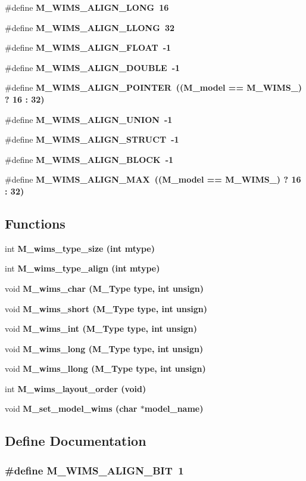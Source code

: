 \begin{CompactItemize}
\#define \bf{M\_\-WIMS\_\-ALIGN\_\-LONG}~16
\item 
\#define \bf{M\_\-WIMS\_\-ALIGN\_\-LLONG}~32
\item 
\#define \bf{M\_\-WIMS\_\-ALIGN\_\-FLOAT}~-1
\item 
\#define \bf{M\_\-WIMS\_\-ALIGN\_\-DOUBLE}~-1
\item 
\#define \bf{M\_\-WIMS\_\-ALIGN\_\-POINTER}~((\bf{M\_\-model} == M\_\-WIMS\_) ? 16 : 32)
\item 
\#define \bf{M\_\-WIMS\_\-ALIGN\_\-UNION}~-1
\item 
\#define \bf{M\_\-WIMS\_\-ALIGN\_\-STRUCT}~-1
\item 
\#define \bf{M\_\-WIMS\_\-ALIGN\_\-BLOCK}~-1
\item 
\#define \bf{M\_\-WIMS\_\-ALIGN\_\-MAX}~((\bf{M\_\-model} == M\_\-WIMS\_) ? 16 : 32)
\end{CompactItemize}
\subsection*{Functions}
\begin{CompactItemize}
\item 
int \bf{M\_\-wims\_\-type\_\-size} (int mtype)
\item 
int \bf{M\_\-wims\_\-type\_\-align} (int mtype)
\item 
void \bf{M\_\-wims\_\-char} (\bf{M\_\-Type} type, int unsign)
\item 
void \bf{M\_\-wims\_\-short} (\bf{M\_\-Type} type, int unsign)
\item 
void \bf{M\_\-wims\_\-int} (\bf{M\_\-Type} type, int unsign)
\item 
void \bf{M\_\-wims\_\-long} (\bf{M\_\-Type} type, int unsign)
\item 
void \bf{M\_\-wims\_\-llong} (\bf{M\_\-Type} type, int unsign)
\item 
int \bf{M\_\-wims\_\-layout\_\-order} (void)
\item 
void \bf{M\_\-set\_\-model\_\-wims} (char $\ast$model\_\-name)
\end{CompactItemize}


\subsection{Define Documentation}
\subsubsection{\setlength{\rightskip}{0pt plus 5cm}\#define M\_\-WIMS\_\-ALIGN\_\-BIT~1}\label{mi__wims_8c_15309f7cc34644cc617a0aa53b8fc764}




